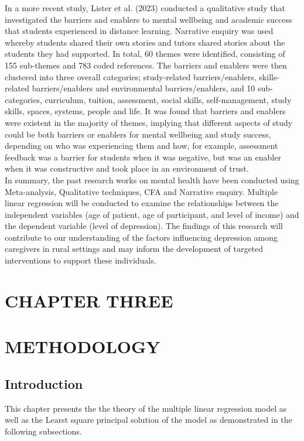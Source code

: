 \documentclass[11pt]{article}\usepackage[]{graphicx}\usepackage[]{xcolor}
\numberwithin{equation}{section}
\numberwithin{table}{section}
\begin{document}
	\noindent In a more recent study, Lister et al. (2023) conducted a qualitative study that investigated the barriers and enablers to mental wellbeing and academic success that students experienced in distance learning. Narrative enquiry was used whereby students shared their own stories and tutors shared stories about the students they had supported. In total, 60 themes were identified, consisting of 155 sub-themes and 783 coded references. The barriers and enablers were then clustered into three overall categories; study-related barriers/enablers, skills-related barriers/enablers and environmental barriers/enablers, and 10 sub-categories, curriculum, tuition, assessment, social skills, self-management, study skills, spaces, systems, people and life. It was found that barriers and enablers were existent in the majority of themes, implying that different aspects of study could be both barriers or enablers for mental wellbeing and study success, depending on who was experiencing them and how, for example, assessment feedback was a barrier for students when it was negative, but was an enabler when it was constructive and took place in an environment of trust.\\
	
	\noindent In summary, the past research works on mental health have been conducted using Meta-analysis, Qualitative techniques, CFA and Narrative enquiry. Multiple linear regression will be conducted to examine the relationships between the independent variables
	(age of patient, age of participant, and level of income) and the dependent
	variable (level of depression). The findings of this research will contribute to
	our understanding of the factors influencing depression among caregivers in rural
	settings and may inform the development of targeted interventions to support
	these individuals. 
\newpage
\section*{CHAPTER THREE}
\section*{METHODOLOGY}
\label{sec:methodology}
\setcounter{section}{3}
\setcounter{subsection}{0}

\subsection{Introduction}
This chapter presents the the theory of the multiple linear regression model as well as the Learst square principal solution of the model as demonstrated in the following subsections.
\end{document}
